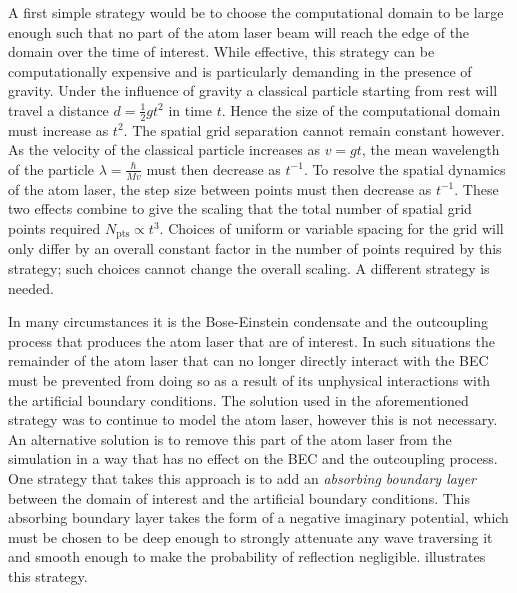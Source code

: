 A first simple strategy would be to choose the computational domain to be large enough such that no part of the atom laser beam will reach the edge of the domain over the time of interest. While effective, this strategy can be computationally expensive and is particularly demanding in the presence of gravity. Under the influence of gravity a classical particle starting from rest will travel a distance $d = \frac{1}{2}g t^2$ in time $t$. Hence the size of the computational domain must increase as $t^2$. The spatial grid separation cannot remain constant however. As the velocity of the classical particle increases as $v = gt$, the mean wavelength of the particle $\displaystyle \lambda = \frac{\hbar}{Mv}$ must then decrease as $t^{-1}$.  To resolve the spatial dynamics of the atom laser, the step size between points must then decrease as $t^{-1}$. These two effects combine to give the scaling that the total number of spatial grid points required $N_\text{pts} \propto t^3$. Choices of uniform or variable spacing for the grid will only differ by an overall constant factor in the number of points required by this strategy; such choices cannot change the overall scaling. A different strategy is needed.

In many circumstances it is the Bose-Einstein condensate and the outcoupling process that produces the atom laser that are of interest. In such situations the remainder of the atom laser that can no longer directly interact with the BEC must be prevented from doing so as a result of its unphysical interactions with the artificial boundary conditions. The solution used in the aforementioned strategy was to continue to model the atom laser, however this is not necessary. An alternative solution is to remove this part of the atom laser from the simulation in a way that has no effect on the BEC and the outcoupling process. One strategy that takes this approach is to add an \emph{absorbing boundary layer} \citep{Kosloff:1986,Neuhasuer:1989} between the domain of interest and the artificial boundary conditions. This absorbing boundary layer takes the form of a negative imaginary potential, which must be chosen to be deep enough to strongly attenuate any wave traversing it and smooth enough to make the probability of reflection negligible.  illustrates this strategy.

